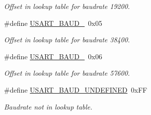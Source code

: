 \begin{DoxyCompactItemize}
\begin{DoxyCompactList}\small\item\em Offset in lookup table for baudrate 19200. \end{DoxyCompactList}\item 
\hypertarget{group__usart__group_gad9a975fee800bda4e15299536fed021a}{\#define \hyperlink{group__usart__group_gad9a975fee800bda4e15299536fed021a}{U\-S\-A\-R\-T\-\_\-\-B\-A\-U\-D\-\_}~0x05}\label{group__usart__group_gad9a975fee800bda4e15299536fed021a}

\begin{DoxyCompactList}\small\item\em Offset in lookup table for baudrate 38400. \end{DoxyCompactList}\item 
\hypertarget{group__usart__group_ga256c82161d6a8093828c46d7f5c2cc99}{\#define \hyperlink{group__usart__group_ga256c82161d6a8093828c46d7f5c2cc99}{U\-S\-A\-R\-T\-\_\-\-B\-A\-U\-D\-\_}~0x06}\label{group__usart__group_ga256c82161d6a8093828c46d7f5c2cc99}

\begin{DoxyCompactList}\small\item\em Offset in lookup table for baudrate 57600. \end{DoxyCompactList}\item 
\hypertarget{group__usart__group_gaf0d4181704d619efa7d78b872824b56a}{\#define \hyperlink{group__usart__group_gaf0d4181704d619efa7d78b872824b56a}{U\-S\-A\-R\-T\-\_\-\-B\-A\-U\-D\-\_\-\-U\-N\-D\-E\-F\-I\-N\-E\-D}~0x\-F\-F}\label{group__usart__group_gaf0d4181704d619efa7d78b872824b56a}

\begin{DoxyCompactList}\small\item\em Baudrate not in lookup table. \end{DoxyCompactList}\end{DoxyCompactItemize}
